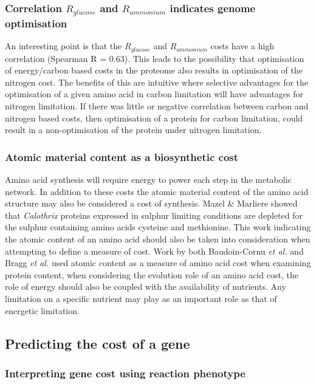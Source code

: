 \subsubsection{Correlation $R_{glucose}$ and $R_{ammonium}$ indicates genome optimisation}%

An interesting point is that the $R_{glucose}$ and $R_{ammonium}$ costs have a high correlation (Spearman R = 0.63). This leads to the possibility that optimisation of energy/carbon based costs in the proteome also results in optimisation of the nitrogen cost. The benefits of this are intuitive where selective advantages for the optimisation of a given amino acid in carbon limitation will have advantages for nitrogen limitation. If there was little or negative correlation between carbon and nitrogen based costs, then optimisation of a protein for carbon limitation, could result in a non-optimisation of the protein under nitrogen limitation.

\subsubsection{Atomic material content as a biosynthetic cost}%

Amino acid synthesis will require energy to power each step in the metabolic network. In addition to these costs the atomic material content of the amino acid structure may also be considered a cost of synthesis. Mazel \& Marliere \cite{mazel1989} showed that \emph{Calothrix} proteins expressed in sulphur limiting conditions are depleted for the sulphur containing amino acids cysteine and methionine. This work indicating the atomic content of an amino acid should also be taken into consideration when attempting to define a measure of cost. Work by both Baudoin-Cornu \emph{et al.} \cite{baudoin2001} and Bragg \emph{et al.} \cite{bragg2006} used atomic content as a measure of amino acid cost when examining protein content, when considering the evolution role of an amino acid cost, the role of energy should also be coupled with the availability of nutrients. Any limitation on a specific nutrient may play as an important role as that of energetic limitation.

\subsection{Predicting the cost of a gene}%

\subsubsection{Interpreting gene cost using reaction phenotype} %

